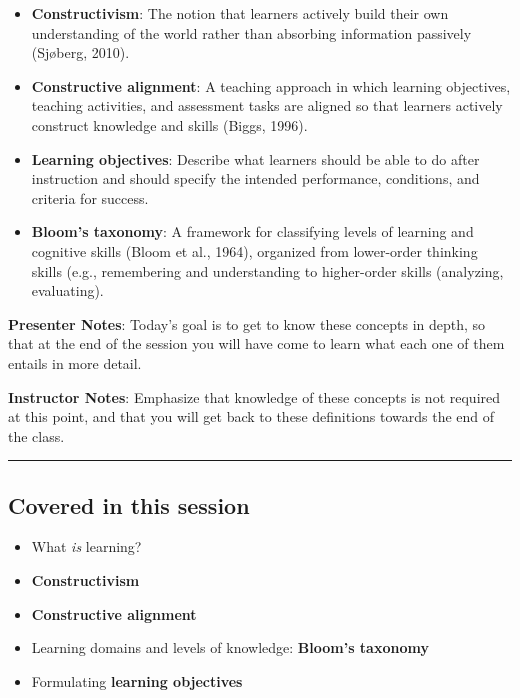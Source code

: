 \documentclass[
  letterpaper,
  DIV=11,
  numbers=noendperiod]{scrartcl}
\providecommand{\tightlist}{%
  \setlength{\itemsep}{0pt}\setlength{\parskip}{0pt}}
\begin{document}
\begin{itemize}
\tightlist
\item
  \textbf{Constructivism}: The notion that learners actively build their
  own understanding of the world rather than absorbing information
  passively (Sjøberg, 2010).
\item
  \textbf{Constructive alignment}: A teaching approach in which learning
  objectives, teaching activities, and assessment tasks are aligned so
  that learners actively construct knowledge and skills (Biggs, 1996).
\item
  \textbf{Learning objectives}: Describe what learners should be able to
  do after instruction and should specify the intended performance,
  conditions, and criteria for success.
\item
  \textbf{Bloom's taxonomy}: A framework for classifying levels of
  learning and cognitive skills ({Bloom et al.}, 1964), organized from
  lower-order thinking skills (e.g., remembering and understanding to
  higher-order skills (analyzing, evaluating).
\end{itemize}

\textbf{Presenter Notes}: Today's goal is to get to know these concepts
in depth, so that at the end of the session you will have come to learn
what each one of them entails in more detail.

\textbf{Instructor Notes}: Emphasize that knowledge of these concepts is
not required at this point, and that you will get back to these
definitions towards the end of the class.

\begin{center}\rule{0.5\linewidth}{0.5pt}\end{center}

\subsection{Covered in this session}\label{covered-in-this-session}

\begin{itemize}
\tightlist
\item
  What \emph{is} learning?
\item
  \textbf{Constructivism}
\item
  \textbf{Constructive alignment}
\item
  Learning domains and levels of knowledge: \textbf{Bloom's taxonomy}
\item
  Formulating \textbf{learning objectives}
\end{itemize}
\end{document}
